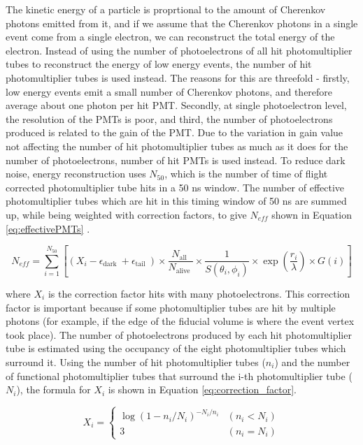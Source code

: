 The kinetic energy of a particle is proprtional to the amount of Cherenkov photons emitted from it, and if we assume that the Cherenkov photons in a single event come from a single electron, we can reconstruct the total energy of the electron. Instead of using the number of photoelectrons of all hit photomultiplier tubes to reconstruct the energy of low energy events, the number of hit photomultiplier tubes is used instead. The reasons for this are threefold - firstly, low energy events emit a small number of Cherenkov photons, and therefore average about one photon per hit PMT. Secondly, at single photoelectron level, the resolution of the PMTs is poor, and third, the number of photoelectrons produced is related to the gain of the PMT.
\newline
Due to the variation in gain value not affecting the number of hit photomultiplier tubes as much as it does for the number of photoelectrons, number of hit PMTs is used instead. To reduce dark noise, energy reconstruction uses $N_{50}$, which is the number of time of flight corrected photomultiplier tube hits in a 50 ns window. The number of effective photomultiplier tubes which are hit in this timing window of 50 ns are summed up, while being weighted with correction factors, to give $N_{eff}$ shown in Equation \ref{eq:effectivePMTs} \cite{ueno_analysis_nodate}. 

\begin{equation}
    N_{e f f}=\sum_{i=1}^{N_{50}}\left[\left(X_{i}-\epsilon_{\text {dark }}+\epsilon_{\text {tail }}\right) \times \frac{N_{\text {all }}}{N_{\text {alive }}} \times \frac{1}{S\left(\theta_{i}, \phi_{i}\right)} \times \exp \left(\frac{r_{i}}{\lambda}\right) \times G(i)\right]
\label{eq:effectivePMTs}
\end{equation}

where $X_{i}$ is the correction factor hits with many photoelectrons. This correction factor is important because if some photomultiplier tubes are hit by multiple photons (for example, if the edge of the fiducial volume is where the event vertex took place). The number of photoelectrons produced by each hit photomultiplier tube is estimated using the occupancy of the eight photomultiplier tubes which surround it. Using the number of hit photomultiplier tubes ($n_{i}$) and the number of functional photomultiplier tubes that surround the i-th photomultiplier tube ($N_{i}$), the formula for $X_{i}$ is shown in Equation \ref{eq:correction_factor}.

\begin{equation}
    X_{i}=\left\{\begin{array}{ll}
    \log \left(1-n_{i} / N_{i}\right)^{-N_{i} / n_{i}} & \left(n_{i}<N_{i}\right) \\
    3 & \left(n_{i}=N_{i}\right)
    \end{array}\right.
    \label{eq:correction_factor}
\end{equation}


